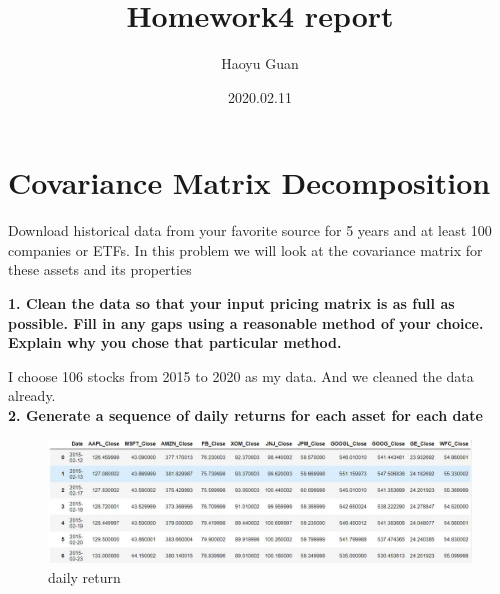 \documentclass{winnower}
\begin{document}
\title{Homework4 report}

\author{Haoyu Guan}








\date{2020.02.11}

\maketitle




\section{Covariance Matrix Decomposition}


\indent Download historical data from your favorite source for 5 years and at least 100 companies or ETFs. In this problem we will
look at the covariance matrix for these assets and its properties

\vspace{12 pt}


\textbf{1. Clean the data so that your input pricing matrix is as full as possible. Fill in any
gaps using a reasonable method of your choice. Explain why you chose that particular
method.}

I choose 106 stocks from 2015 to 2020 as my data. And we cleaned the data already.
\\

\textbf{2. Generate a sequence of daily returns for each asset for each date}

\begin{figure}[!h]
\begin{center}
\includegraphics[scale=0.6]{1_1.jpg}
\caption
{daily return}
\label{fig:f1}
\end{center}
\end{figure}
\end{document}
